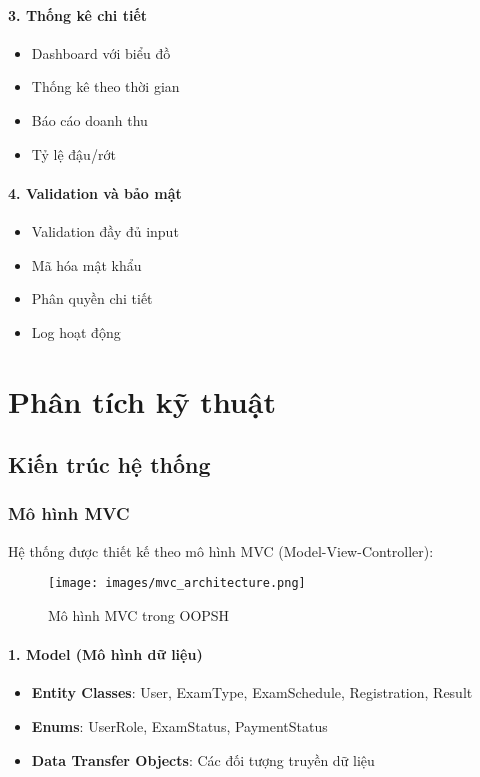 \documentclass[12pt,a4paper]{article}
\begin{document}
\paragraph{3. Thống kê chi tiết}
\begin{itemize}
    \item Dashboard với biểu đồ
    \item Thống kê theo thời gian
    \item Báo cáo doanh thu
    \item Tỷ lệ đậu/rớt
\end{itemize}

\paragraph{4. Validation và bảo mật}
\begin{itemize}
    \item Validation đầy đủ input
    \item Mã hóa mật khẩu
    \item Phân quyền chi tiết
    \item Log hoạt động
\end{itemize}

\section{Phân tích kỹ thuật}

\subsection{Kiến trúc hệ thống}

\subsubsection{Mô hình MVC}

Hệ thống được thiết kế theo mô hình MVC (Model-View-Controller):

\begin{figure}[H]
\centering
\texttt{[image: images/mvc\_architecture.png]}
\caption{Mô hình MVC trong OOPSH}
\label{fig:mvc_architecture}
\end{figure}

\paragraph{1. Model (Mô hình dữ liệu)}
\begin{itemize}
    \item \textbf{Entity Classes}: User, ExamType, ExamSchedule, Registration, Result
    \item \textbf{Enums}: UserRole, ExamStatus, PaymentStatus
    \item \textbf{Data Transfer Objects}: Các đối tượng truyền dữ liệu
\end{itemize}
\end{document}
